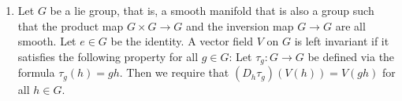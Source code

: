 \documentclass{article}
\begin{document}
\begin{enumerate}[label={\bf Q\arabic*:}]
\begin{enumerate}
\begin{proof}
          Then we have
          \begin{align*}
            \delta(f) &=\delta(f\restriction U) \\
              &=\delta(((f\circ\phi^{-1})\circ\phi)\restriction U) \\
              &=\delta(r+\sum_{i=1}^n(\pi_i\circ\phi)(f_i\circ\phi)) &
                (\because f\circ\phi^{-1} =r+\sum_{i=1}^n\pi_if_i) \\
              &=\delta(r+\sum_{i=1}^n\Pi_iF_i) & \\
              &=\delta(r)+\sum_{i=1}^n\delta(\Pi_iF_i) \\
              &=\sum_{i=1}^n\left[\delta(\Pi_i)F_i(p)
                +\Pi_i(p)\delta(F_i)\right] \\
              &=\sum_{i=1}^n\delta(\Pi_i)F_i(p) & (\because
                \Pi_i(p)=(\pi_i\circ\phi)(p)=\pi_i(\bar{0})=\bar{0}) \\
              &=\sum_{i=1}^n\delta(\Pi_i)(f_i\circ\phi)(p) \\
              &=\sum_{i=1}^n\delta(\Pi_i)f_i(\bar{0}) \\
              &=\sum_{i=1}^n\delta(\Pi_i)
                \left.\frac{\partial}{\partial
                x_i}\left[\sum_{j=1}^nx_jf_j(\bar{x})\right]\right
                \rvert_{\bar{0}} \\
              &=\sum_{i=1}^n\delta(\Pi_i)
                \left[\left.\frac{\partial(f\circ\phi^{-1})}{\partial
                x_i}\right\rvert_{\bar{0}}\right] \\
              &=D_p(f\circ\phi^{-1})(v) &(\text{for some}\;
                v=(\delta(\pi_1),\ldots,\delta(\pi_n))\in T_pM^n) \\
              &=\delta_{\vec{v}}(f). \\
          \end{align*}
          Thus, $\delta=\Psi(\vec{v})$, and since
          $\delta\in\text{Der}_pM^n$ was arbitrary, $\Psi$ is surjective.
        \end{proof}
    \end{enumerate}

  \item Let $G$ be a lie group, that is, a smooth manifold that is also a
    group such that the product map $G\times G\to G$ and the inversion map
    $G\to G$ are all smooth. Let $e\in G$ be the identity. A vector field
    $V$ on $G$ is left invariant if it satisfies the following property for
    all $g\in G$: Let $\tau_g:G\to G$ be defined via the formula
    $\tau_g(h)=gh$. Then we require that $(D_h\tau_g)(V(h))=V(gh)$ for all
    $h\in G$.


\end{enumerate}
\end{document}
